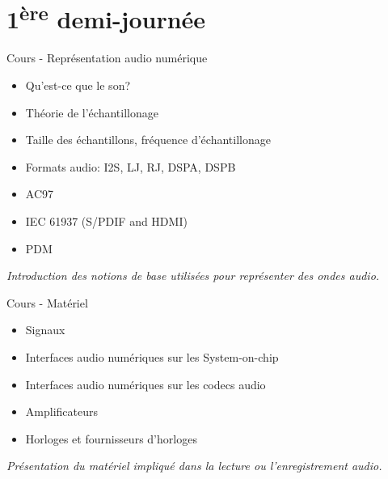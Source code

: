 \documentclass[a4paper,12pt,obeyspaces,spaces,hyphens]{article}
\begin{document}
\feshowtitle

\feshowinfo

\section{1\textsuperscript{ère} demi-journée}

\feagendatwocolumn
{Cours - Représentation audio numérique}
{
  \begin{itemize}
  \item Qu'est-ce que le son?
  \item Théorie de l'échantillonage
  \item Taille des échantillons, fréquence d'échantillonage
  \item Formats audio: I2S, LJ, RJ, DSPA, DSPB
  \item AC97
  \item IEC 61937 (S/PDIF and HDMI)
  \item PDM
  \end{itemize}
  \vspace{0.5em}
  {\em Introduction des notions de base utilisées pour représenter des ondes audio.}
}
{Cours - Matériel}
{
  \begin{itemize}
  \item Signaux
  \item Interfaces audio numériques sur les System-on-chip
  \item Interfaces audio numériques sur les codecs audio
  \item Amplificateurs
  \item Horloges et fournisseurs d'horloges
  \end{itemize}
  \vspace{0.5em}
  {\em Présentation du matériel impliqué dans la lecture ou l'enregistrement audio.}
}
\end{document}
